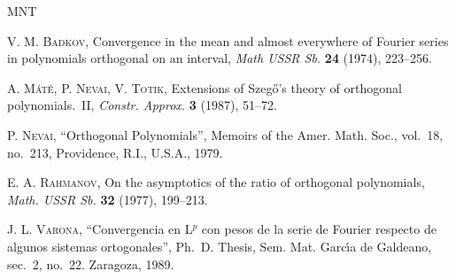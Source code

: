 \documentclass[a4paper,12pt]{article}
\theoremstyle{plain}
\theoremstyle{definition}
\begin{document}
\begin{thebibliography}{MNT}

\frenchspacing

\textsc{V. M. Badkov},
Convergence in the mean and almost everywhere of Fourier series
in polynomials orthogonal on an interval,
\textit{Math USSR Sb.} \textbf{24} (1974), 223--256.

\textsc{A. M\'{a}t\'{e}, P. Nevai, V. Totik},
Extensions of Szeg\H{o}'s theory of orthogonal polynomials.~II,
\textit{Constr. Approx.} \textbf{3} (1987), 51--72.

\textsc{P. Nevai},
``Orthogonal Polynomials'',
Memoirs of the Amer. Math. Soc., vol.~18,
no.~213, Providence, R.I., U.S.A., 1979.

\textsc{E. A. Rahmanov},
On the asymptotics of the ratio of orthogonal polynomials,
\textit{Math. USSR Sb.} \textbf{32} (1977), 199--213.

\textsc{J. L. Varona},
``Convergencia en L$^{p}$ con pesos de la serie de Fourier
respecto de algunos sistemas ortogonales'', Ph.~D. Thesis,
Sem. Mat. Garc\'{\i}a de Galdeano, sec.~2, no.~22. Zaragoza, 1989.

\end{thebibliography}
\end{document}
